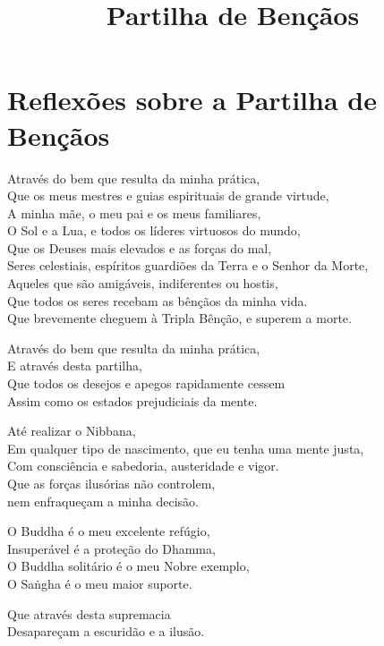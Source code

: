 \documentclass[
  babelLanguage=portuguese,
  final,
]{chantingbook}
\title{Partilha de Bençãos}
\begin{document}
\mainmatter

\eveningChapterSettings

\chapter[Partilha de Bençãos]{Reflexões sobre a Partilha de Bençãos}

\thispagestyle{empty}

\enlargethispage{2\baselineskip}

\begin{leader}
\end{leader}


Através do bem que resulta da minha prática,\\
Que os meus mestres e guias espirituais de grande virtude,\\
A minha mãe, o meu pai e os meus familiares,\\
O Sol e a Lua, e todos os líderes virtuosos do mundo,\\
Que os Deuses mais elevados e as forças do mal,\\
Seres celestiais, espíritos guardiões da Terra e o Senhor da Morte,\\
Aqueles que são amigáveis, indiferentes ou hostis,\\
Que todos os seres recebam as bênçãos da minha vida.\\
Que brevemente cheguem à Tripla Bênção, e superem a morte.

Através do bem que resulta da minha prática,\\
E através desta partilha,\\
Que todos os desejos e apegos rapidamente cessem\\
Assim como os estados prejudiciais da mente.

Até realizar o Nibbana,\\
Em qualquer tipo de nascimento, que eu tenha uma mente justa,\\
Com consciência e sabedoria, austeridade e vigor.\\
Que as forças ilusórias não controlem,\\
nem enfraqueçam a minha decisão.

O Buddha é o meu excelente refúgio,\\
Insuperável é a proteção do Dhamma,\\
O Buddha solitário é o meu Nobre exemplo,\\
O Saṅgha é o meu maior suporte.

Que através desta supremacia\\
Desapareçam a escuridão e a ilusão.
\end{document}

